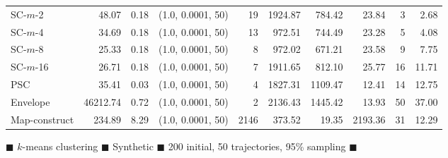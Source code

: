 \documentclass[11pt]{article}
\begin{document}
\begin{figure}
\begin{center}
\begin{minipage}{\textwidth}
{\begin{tabular}{@{}lrrcrrrrrr@{}}
        SC-$m$-2 & 48.07 & 0.18 & (1.0, 0.0001, 50) & 19 & 1924.87 & 784.42 & 23.84 & 3 & 2.68\\
        SC-$m$-4 & 34.69 & 0.18 & (1.0, 0.0001, 50) & 13 & 972.51 & 744.49 & 23.28 & 5 & 4.08\\
        SC-$m$-8 & 25.33 & 0.18 & (1.0, 0.0001, 50) & 8 & 972.02 & 671.21 & 23.58 & 9 & 7.75\\
        SC-$m$-16 & 26.71 & 0.18 & (1.0, 0.0001, 50) & 7 & 1911.65 & 812.10 & 25.77 & 16 & 11.71\\
        PSC & 35.41 & 0.03 & (1.0, 0.0001, 50) & 4 & 1827.31 & 1109.47 & 12.41 & 14 & 12.75\\
        Envelope & 46212.74 & 0.72 & (1.0, 0.0001, 50) & 2 & 2136.43 & 1445.42 & 13.93 & 50 & 37.00\\
        Map-construct & 234.89 & 8.29 & (1.0, 0.0001, 50) & 2146 & 373.52 & 19.35 & 2193.36 & 31 & 12.29\\
        \bottomrule
    \end{tabular}
    }
    \end{minipage}
%
        \caption{$\blacksquare$ $k$-means clustering $\blacksquare$ Synthetic $\blacksquare$ 200 initial, 50 trajectories, 95\% sampling $\blacksquare$}
%
    \end{center} \end{figure}
\clearpage
\newpage 
%
\clearpage
%
\end{document}
